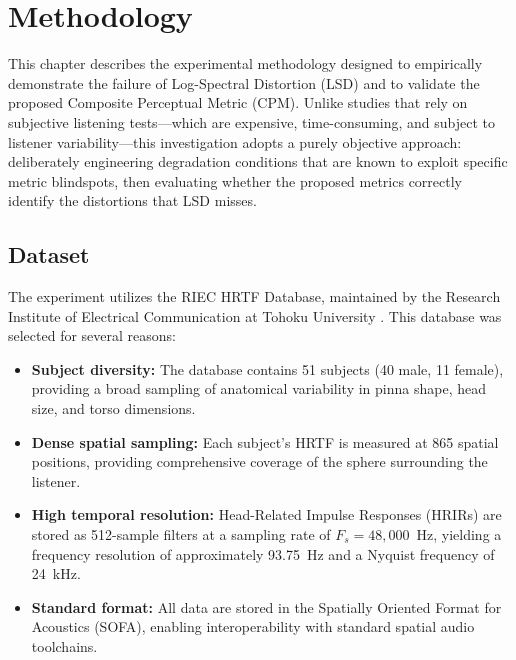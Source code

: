\documentclass[12pt,a4paper]{article}
\begin{document}

\newpage
\section{Methodology}

This chapter describes the experimental methodology designed to empirically demonstrate the failure of Log-Spectral Distortion (LSD) and to validate the proposed Composite Perceptual Metric (CPM). Unlike studies that rely on subjective listening tests---which are expensive, time-consuming, and subject to listener variability---this investigation adopts a purely objective approach: deliberately engineering degradation conditions that are known to exploit specific metric blindspots, then evaluating whether the proposed metrics correctly identify the distortions that LSD misses.

\subsection{Dataset}

The experiment utilizes the RIEC HRTF Database, maintained by the Research Institute of Electrical Communication at Tohoku University \cite{watanabe2014}. This database was selected for several reasons:

\begin{itemize}
  \item \textbf{Subject diversity:} The database contains 51 subjects (40 male, 11 female), providing a broad sampling of anatomical variability in pinna shape, head size, and torso dimensions.
  \item \textbf{Dense spatial sampling:} Each subject's HRTF is measured at 865 spatial positions, providing comprehensive coverage of the sphere surrounding the listener.
  \item \textbf{High temporal resolution:} Head-Related Impulse Responses (HRIRs) are stored as 512-sample filters at a sampling rate of $F_s = 48{,}000$~Hz, yielding a frequency resolution of approximately 93.75~Hz and a Nyquist frequency of 24~kHz.
  \item \textbf{Standard format:} All data are stored in the Spatially Oriented Format for Acoustics (SOFA), enabling interoperability with standard spatial audio toolchains.
\end{itemize}
\end{document}
